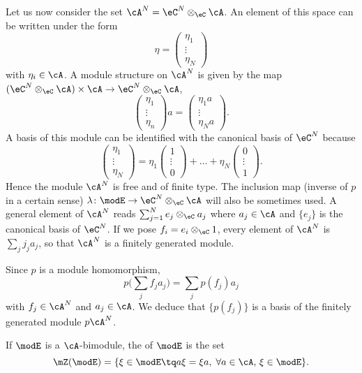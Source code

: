 Let us now consider the set $\cA^N=\eC^N\otimes_{\eC}\cA$. An element of this space can be written under the form 
\[ 
  \eta=
\begin{pmatrix}
\eta_1\\\vdots\\\eta_N
\end{pmatrix}
\]
with $\eta_i\in\cA$. A module structure on $\cA^N$ is given by the map $(\eC^N\otimes_{\eC}\cA)\times\cA\to \eC^N\otimes_{\eC}\cA$,
\[ 
  \begin{pmatrix}
\eta_1\\\vdots\\\eta_n
\end{pmatrix}a=
\begin{pmatrix}
\eta_1 a\\\vdots\\\eta_N a
\end{pmatrix}.
\]
A basis of this module can be identified with the canonical basis of $\eC^N$ because
\[ 
  \begin{pmatrix}
\eta_1\\\vdots\\\eta_N
\end{pmatrix}=\eta_1
\begin{pmatrix}
1\\\vdots\\0
\end{pmatrix}+\ldots+
\eta_N\begin{pmatrix}
0\\\vdots\\1
\end{pmatrix}.
\]
Hence the module $\cA^N$ is free and of finite type. The inclusion map (inverse of $p$ in a certain sense) $\lambda\colon \modE\to \eC^N\otimes_{\eC}\cA$\label{PgdeflambdaMod} will also be sometimes used. A general element of $\cA^N$ reads $\sum_{j=1}^{N}e_j\otimes_{\eC}a_j$ where $a_j\in\cA$ and $\{ e_j \}$ is the canonical basis of $\eC^N$. If we pose $f_i=e_i\otimes_{\eC}1$, every element of $\cA^{N}$ is $\sum_{j}j_ja_j$, so that $\cA^N$ is a finitely generated module.


Since $p$ is a module homomorphism,
\[ 
  p\big( \sum_{j}f_ja_j \big)=\sum_j p(f_j)a_j
\]
with $f_j\in\cA^N$ and $a_j\in\cA$. We deduce that $\{ p(f_j) \}$ is a basis of the finitely generated module $p\cA^N$.

If $\modE$ is a $\cA$-bimodule, the  of $\modE$ is the set
\begin{equation}
\mZ(\modE)=\{ \xi\in\modE\tq a\xi=\xi a,\;\forall a\in\cA,\,\xi\in\modE \}.
\end{equation}

